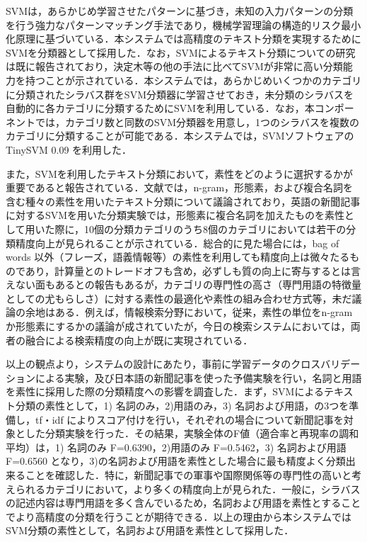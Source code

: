\documentclass[japanese]{jnlp_1.4}
\begin{document}
\noindent
{}

SVMは，あらかじめ学習させたパターンに基づき，未知の入力パターンの分類を行う強力なパターンマッチング手法であり，機械学習理論の構造的リスク最小化原理に基づいている\cite{Book_Vapnik_1995,Article_Cortes_1995}．本システムでは高精度のテキスト分類を実現するためにSVMを分類器として採用した．なお，SVMによるテキスト分類についての研究は既に報告されており，決定木等の他の手法に比べてSVMが非常に高い分類能力を持つことが示されている\cite{Inproc_Dumais_1998,Inproc_Joachims_1998}．本システムでは，あらかじめいくつかのカテゴリに分類されたシラバス群をSVM分類器に学習させておき，未分類のシラバスを自動的に各カテゴリに分類するためにSVMを利用している．なお，本コンポーネントでは，カテゴリ数と同数のSVM分類器を用意し，1つのシラバスを複数のカテゴリに分類することが可能である．本システムでは，SVMソフトウェアのTinySVM 0.09 を利用した．

また，SVMを利用したテキスト分類において，素性をどのように選択するかが重要であると報告されている\cite{Inproc_Taira_1999}．文献\cite{Inproc_Moschitti_2004}では，n-gram，形態素，および複合名詞を含む種々の素性を用いたテキスト分類について議論されており，英語の新聞記事に対するSVMを用いた分類実験では，形態素に複合名詞を加えたものを素性として用いた際に，10個の分類カテゴリのうち8個のカテゴリにおいては若干の分類精度向上が見られることが示されている．総合的に見た場合には，bag of words 以外（フレーズ，語義情報等）の素性を利用しても精度向上は微々たるものであり，計算量とのトレードオフも含め，必ずしも質の向上に寄与するとは言えない面もあるとの報告もあるが，カテゴリの専門性の高さ（専門用語の特徴量としての尤もらしさ）に対する素性の最適化や素性の組み合わせ方式等，未だ議論の余地はある．例えば，情報検索分野において，従来，素性の単位をn-gramか形態素にするかの議論が成されていたが，今日の検索システムにおいては，両者の融合による検索精度の向上が既に実現されている．

以上の観点より，システムの設計にあたり，事前に学習データのクロスバリデーションによる実験，及び日本語の新聞記事を使った予備実験を行い，名詞と用語を素性に採用した際の分類精度への影響を調査した．まず，SVMによるテキスト分類の素性として，1) 名詞のみ，2)用語のみ，3) 名詞および用語，の3つを準備し，tf・idf \cite{Article_Salton_1991}によりスコア付けを行い，それぞれの場合について新聞記事を対象とした分類実験を行った．その結果，実験全体のF値（適合率と再現率の調和平均）は，1) 名詞のみ F=0.6390，2)用語のみ F=0.5462，3) 名詞および用語 F=0.6560 となり，3)の名詞および用語を素性とした場合に最も精度よく分類出来ることを確認した．特に，新聞記事での軍事や国際関係等の専門性の高いと考えられるカテゴリにおいて，より多くの精度向上が見られた．一般に，シラバスの記述内容は専門用語を多く含んでいるため，名詞および用語を素性とすることでより高精度の分類を行うことが期待できる．以上の理由から本システムではSVM分類の素性として，名詞および用語を素性として採用した．
\end{document}
